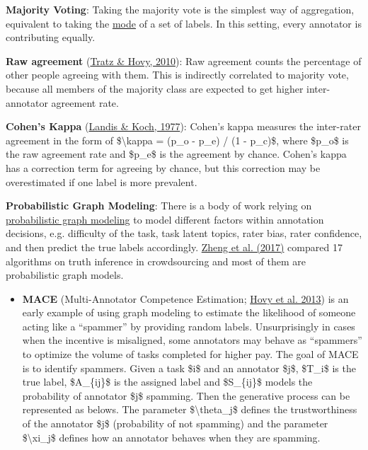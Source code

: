 \textbf{Majority Voting}: Taking the majority vote is the simplest way of aggregation, equivalent to taking the \href{https://en.wikipedia.org/wiki/Mode_(statistics)}{mode} of a set of labels. In this setting, every annotator is contributing equally.

\textbf{Raw agreement} (\href{https://aclanthology.org/P10-1070/}{Tratz \& Hovy, 2010}): Raw agreement counts the percentage of other people agreeing with them. This is indirectly correlated to majority vote, because all members of the majority class are expected to get higher inter-annotator agreement rate.

\textbf{Cohen's Kappa} (\href{https://www.jstor.org/stable/2529310}{Landis \& Koch, 1977}): Cohen's kappa measures the inter-rater agreement in the form of \$\textbackslash kappa = (p\_o - p\_e) / (1 - p\_c)\$, where \$p\_o\$ is the raw agreement rate and \$p\_e\$ is the agreement by chance. Cohen's kappa has a correction term for agreeing by chance, but this correction may be overestimated if one label is more prevalent.

\textbf{Probabilistic Graph Modeling}: There is a body of work relying on \href{https://en.wikipedia.org/wiki/Graphical_model}{probabilistic graph modeling} to model different factors within annotation decisions, e.g. difficulty of the task, task latent topics, rater bias, rater confidence, and then predict the true labels accordingly. \href{https://dl.acm.org/doi/abs/10.14778/3055540.3055547}{Zheng et al. (2017)} compared 17 algorithms on truth inference in crowdsourcing and most of them are probabilistic graph models.

\begin{itemize}
\tightlist
\item
  \textbf{MACE} (Multi-Annotator Competence Estimation; \href{https://aclanthology.org/N13-1132}{Hovy et al. 2013}) is an early example of using graph modeling to estimate the likelihood of someone acting like a ``spammer'' by providing random labels. Unsurprisingly in cases when the incentive is misaligned, some annotators may behave as ``spammers'' to optimize the volume of tasks completed for higher pay. The goal of MACE is to identify spammers. Given a task \$i\$ and an annotator \$j\$, \$T\_i\$ is the true label, \$A\_\{ij\}\$ is the assigned label and \$S\_\{ij\}\$ models the probability of annotator \$j\$ spamming. Then the generative process can be represented as belows. The parameter \$\textbackslash theta\_j\$ defines the trustworthiness of the annotator \$j\$ (probability of not spamming) and the parameter \$\textbackslash xi\_j\$ defines how an annotator behaves when they are spamming.
\end{itemize}

